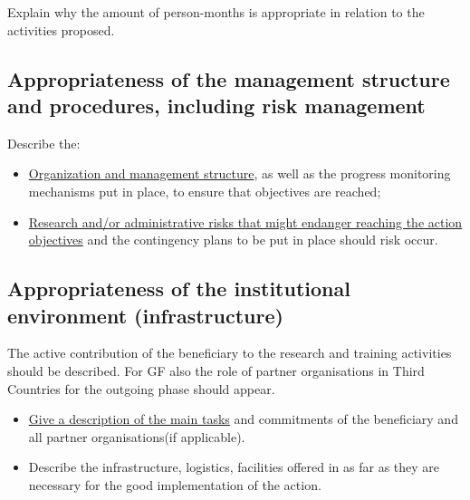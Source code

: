 \medskip\noindent
Explain why the amount of person-months is appropriate in relation to the activities proposed.





\subsection{Appropriateness of the management structure and procedures, including risk management}
\label{sec:implementation_management}

Describe the: 

\begin{itemize}
  \item \ul{Organization and management structure}, as well as the progress monitoring mechanisms put in place, to ensure that objectives are reached; 
  \item \ul{Research and/or administrative risks that might endanger reaching the action objectives} and the contingency plans to be put in place should risk occur.  
\end{itemize}





\subsection{Appropriateness of the institutional environment (infrastructure)}
\label{sec:implementation_infrastructure}

The active contribution of the beneficiary to the research and training activities should be described. 
For GF also the role of partner organisations in Third Countries for the outgoing phase should appear. 

\begin{itemize}
  \item \ul{Give a description of the main tasks} and commitments of the beneficiary and all partner organisations(if applicable).
  \item Describe the infrastructure, logistics, facilities offered in as far as they are necessary for the good implementation of the action.
\end{itemize}





\markEndPageLimit